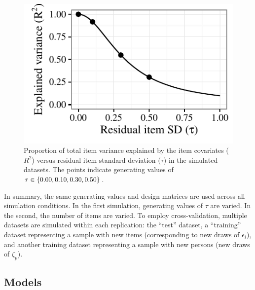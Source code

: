 \documentclass[12pt, letterpaper]{article}
\begin{document}
\begin{figure}[tbp]
	\centering
	\includegraphics{chapter_2/figs/rsq_vs_tau.pdf}
	\caption{Proportion of total item variance explained by the item covariates ($R^2$) versus residual item standard deviation ($\tau$) in the simulated datasets. The points indicate generating values of $\tau \in \{0.00, 0.10, 0.30, {} 0.50\}$.}
	\label{fig:rsq-vs-tau}
\end{figure}

In summary, the same generating values and design matrices are used across all simulation conditions.
In the first simulation, generating values of $\tau$ are varied. In the second, the number of items are varied.
To employ cross-validation, multiple datasets are simulated within each replication: the ``test'' dataset, a ``training'' dataset representing a sample with new items (corresponding to new draws of $\epsilon_i$), and another training dataset representing a sample with new persons (new draws of $\zeta_p$).


\subsection{Models}
\end{document}
